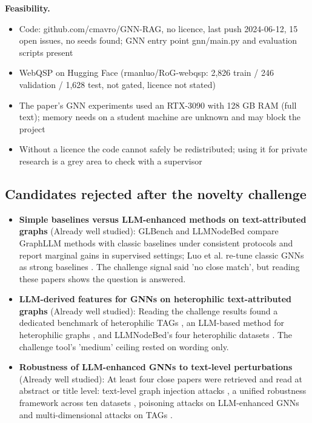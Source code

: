 \documentclass[11pt,a4paper]{article}
\begin{document}
\textbf{Feasibility.}
\begin{itemize}
\item [V] Code: github.com/cmavro/GNN-RAG, no licence, last push 2024-06-12, 15 open issues, no seeds found; GNN entry point gnn/main.py and evaluation scripts present
\item [V] WebQSP on Hugging Face (rmanluo/RoG-webqsp: 2,826 train / 246 validation / 1,628 test, not gated, licence not stated)
\item [V] The paper's GNN experiments used an RTX-3090 with 128 GB RAM (full text); memory needs on a student machine are unknown and may block the project
\item [E] Without a licence the code cannot safely be redistributed; using it for private research is a grey area to check with a supervisor
\end{itemize}

\subsection{Candidates rejected after the novelty challenge}

\begin{itemize}
\item \textbf{Simple baselines versus LLM-enhanced methods on text-attributed graphs} (Already well studied): GLBench \cite{li2024glbench} and LLMNodeBed \cite{wu2025llmnodebed} compare GraphLLM methods with classic baselines under consistent protocols and report marginal gains in supervised settings; Luo et al. re-tune classic GNNs as strong baselines \cite{luo2024classic}. The challenge signal said 'no close match', but reading these papers shows the question is answered.
\item \textbf{LLM-derived features for GNNs on heterophilic text-attributed graphs} (Already well studied): Reading the challenge results found a dedicated benchmark of heterophilic TAGs \cite{li2025hetgb}, an LLM-based method for heterophilic graphs \cite{wu2024llmhetero}, and LLMNodeBed's four heterophilic datasets \cite{wu2025llmnodebed}. The challenge tool's 'medium' ceiling rested on wording only.
\item \textbf{Robustness of LLM-enhanced GNNs to text-level perturbations} (Already well studied): At least four close papers were retrieved and read at abstract or title level: text-level graph injection attacks \cite{lei2024intruding}, a unified robustness framework across ten datasets \cite{lei2025tagrobust}, poisoning attacks on LLM-enhanced GNNs \cite{ma2026poisoning} and multi-dimensional attacks on TAGs \cite{fan2026vulnerability}.
\end{itemize}
\end{document}
